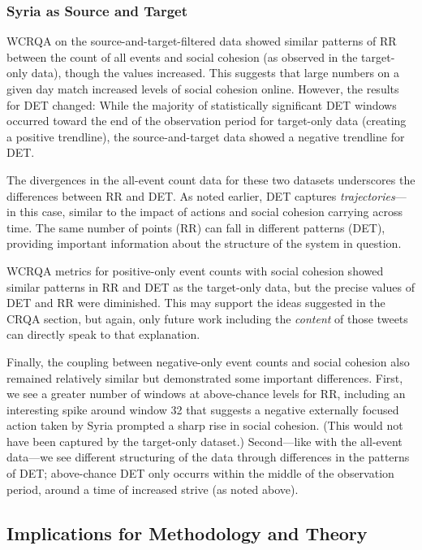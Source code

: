 \documentclass[english,man]{apa6}
\begin{document}
\hypertarget{syria-as-source-and-target-3}{%
\subsubsection{Syria as Source and Target}\label{syria-as-source-and-target-3}}

WCRQA on the source-and-target-filtered data showed similar patterns of RR
between the count of all events and social cohesion (as observed in the
target-only data), though the values increased. This suggests that large numbers
on a given day match increased levels of social cohesion online. However, the
results for DET changed: While the majority of statistically significant DET
windows occurred toward the end of the observation period for target-only data
(creating a positive trendline), the source-and-target data showed a negative
trendline for DET.

The divergences in the all-event count data for these two datasets underscores
the differences between RR and DET. As noted earlier, DET captures
\emph{trajectories}---in this case, similar to the impact of actions and social
cohesion carrying across time. The same number of points (RR) can fall in
different patterns (DET), providing important information about the structure of
the system in question.

WCRQA metrics for positive-only event counts with social cohesion showed similar
patterns in RR and DET as the target-only data, but the precise values of DET
and RR were diminished. This may support the ideas suggested in the CRQA
section, but again, only future work including the \emph{content} of those tweets can
directly speak to that explanation.

Finally, the coupling between negative-only event counts and social cohesion
also remained relatively similar but demonstrated some important differences.
First, we see a greater number of windows at above-chance levels for RR,
including an interesting spike around window 32 that suggests a negative
externally focused action taken by Syria prompted a sharp rise in social
cohesion. (This would not have been captured by the target-only dataset.)
Second---like with the all-event data---we see different structuring of the data
through differences in the patterns of DET; above-chance DET only occurrs within
the middle of the observation period, around a time of increased strive (as
noted above).

\hypertarget{implications-for-methodology-and-theory}{%
\subsection{Implications for Methodology and Theory}\label{implications-for-methodology-and-theory}}
\end{document}
